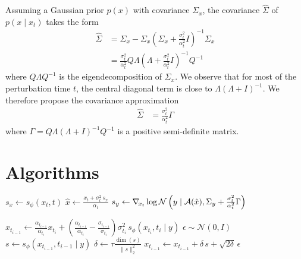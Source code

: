 \begin{subappendices}
Assuming a Gaussian prior $p(x)$ with covariance $\Sigma_x$, the covariance $\hat{\Sigma}$ of $p(x \mid x_t)$ takes the form
\begin{align*}
    \hat{\Sigma} & = \Sigma_x - \Sigma_x \left(\Sigma_x + \frac{\sigma_t^2}{\alpha_t^2} I \right)^{-1} \Sigma_x \\
    & = \frac{\sigma_t^2}{\alpha_t^2} Q \Lambda \left(\Lambda + \frac{\sigma_t^2}{\alpha_t^2} I \right)^{-1} Q^{-1}
\end{align*}
where $Q \Lambda Q^{-1}$ is the eigendecomposition of $\Sigma_x$. We observe that for most of the perturbation time $t$, the central diagonal term is close to $\Lambda (\Lambda + I)^{-1}$. We therefore propose the covariance approximation
\begin{align*}
    \hat{\Sigma} & = \frac{\sigma_t^2}{\alpha_t^2} \Gamma
\end{align*}
where $\Gamma = Q \Lambda \left(\Lambda + I\right)^{-1} Q^{-1}$ is a positive semi-definite matrix.

\clearpage
\section{Algorithms} \label{app:sda-aglorithms}

\begin{algorithm}[!h]
    \caption{Estimating the posterior score $\grad{x_t} \log p(x_t \mid y)$} \label{alg:posterior}
    \begin{algorithmic}[1]
            \State $s_x \gets s_\phi(x_t, t)$
            \State $\hat{x} \gets \frac{x_t + \sigma_t^2 \, s_x}{\alpha_t}$
            \State $s_y \gets \nabla_{\!{x_t}} \log \mathcal{N} \left(y \mid \mathcal{A}(\hat{x}), \Sigma_y + \frac{\sigma_t^2}{\alpha_t^2} \Gamma \right)$
            \State {}
        \EndFunction{}
	\end{algorithmic}
\end{algorithm}

\begin{algorithm}[!h]
    \caption{Predictor-Corrector sampling from $s_\phi(x_t, t \mid y)$} \label{alg:sampling}
    \begin{algorithmic}[1]
                \State $x_{t_{i-1}} \gets \frac{\alpha_{t_{i-1}}}{\alpha_{t_i}} x_{t_i} + \left( \frac{\alpha_{t_{i-1}}}{\alpha_{t_i}} - \frac{\sigma_{t_{i-1}}}{\sigma_{t_i}} \right) \sigma_{t_i}^2 \, s_\phi(x_{t_i}, t_i \mid y)$
                    \State $\epsilon \sim \mathcal{N}(0, I)$
                    \State $s \gets s_\phi(x_{t_{i-1}}, t_{i-1} \mid y)$
                    \State $\delta \gets \tau \frac{\dim(s)}{\| s \|_2^2}$
                    \State $x_{t_{i-1}} \gets x_{t_{i-1}} + \delta \, s + \sqrt{2 \delta} \, \epsilon$
                \EndFor
            \EndFor
            \State {}
        \EndFunction{}
	\end{algorithmic}
\end{algorithm}


\end{subappendices}
